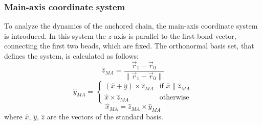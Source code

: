 \documentclass[
    paper=A4,pagesize=automedia,fontsize=12pt,
    BCOR=15mm,DIV=22,
    twoside,headinclude,footinclude=false,
    fleqn,             %
    bibliography=totocnumbered,          %
    listof=totoc,                %
    listof=flat,                 %
    cleardoublepage=empty      %
    numbers=endperiod
]{scrartcl}
\begin{document}
\subsubsection{Main-axis coordinate system}\label{sec:main-axis}
To analyze the dynamics of the anchored chain, the main-axis coordinate
system is introduced. In this system the $z$ axis is parallel to the
first bond vector, connecting the first two beads, which are fixed.
The orthonormal basis set, that defines the system, is calculated as follows:
\begin{equation}
    \hat{z}_{MA} = \frac{\vec{r}_1 - \vec{r}_0}{\| \vec{r}_1 - \vec{r}_0 \|}
\end{equation}
\begin{equation}
    \hat{y}_{MA} = 
    \begin{cases}
        (\hat{x} + \hat{y}) \times \hat{z}_{MA} & \text{if } \hat{x} \parallel \hat{z}_{MA} \\
        \hat{x} \times \hat{z}_{MA} & \text{otherwise}
    \end{cases}
\end{equation}
\begin{equation}
    \hat{x}_{MA} = \hat{z}_{MA} \times \hat{y}_{MA} 
\end{equation}
where $\hat{x}$, $\hat{y}$, $\hat{z}$ are the vectors of the standard basis. 
\end{document}
